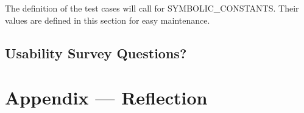 \documentclass[12pt, titlepage]{article}
\begin{document}
The definition of the test cases will call for SYMBOLIC\_CONSTANTS.
Their values are defined in this section for easy maintenance.

\subsection{Usability Survey Questions?}


\newpage



\newpage{}
\section*{Appendix --- Reflection}
\end{document}
